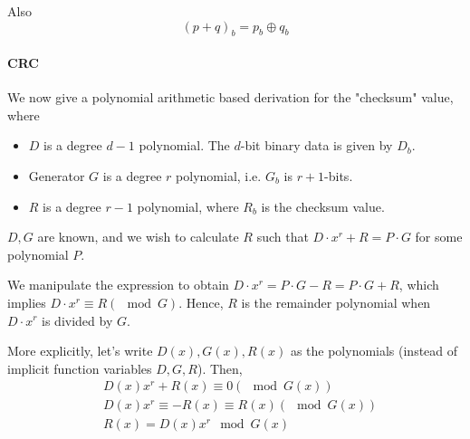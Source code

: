 \documentclass[a4paper]{article}
\begin{document}
Also
\begin{equation}
	(p + q)_b = p_b \oplus q_b
\end{equation}

\paragraph{CRC} We now give a polynomial arithmetic based derivation for the "checksum" value, where
\begin{itemize}
	\item $D$ is a degree $d-1$ polynomial. The $d$-bit binary data is given by $D_b$.
	\item Generator $G$ is a degree $r$ polynomial, i.e. $G_b$ is $r+1$-bits.
	\item $R$ is a degree $r-1$ polynomial, where $R_b$ is the checksum value.
\end{itemize}
$D, G$ are known, and we wish to calculate $R$ such that $D\cdot x^r + R = P\cdot G$ for some polynomial $P$.

We manipulate the expression to obtain $D\cdot x^r = P\cdot G - R = P\cdot G + R$, which implies $D\cdot x^r\equiv R (\mod G)$. Hence, $R$ is the remainder polynomial when $D\cdot x^r$ is divided by $G$.

More explicitly, let's write $D(x), G(x), R(x)$ as the polynomials (instead of implicit function variables $D, G, R$). Then,
\begin{equation}
\begin{aligned}
&D(x)x^r + R(x)\equiv 0(\mod G(x))\\
&D(x)x^r\equiv -R(x)\equiv R(x)(\mod G(x))\\
&R(x) = D(x)x^r\mod G(x)
\end{aligned}
\end{equation}
\end{document}
